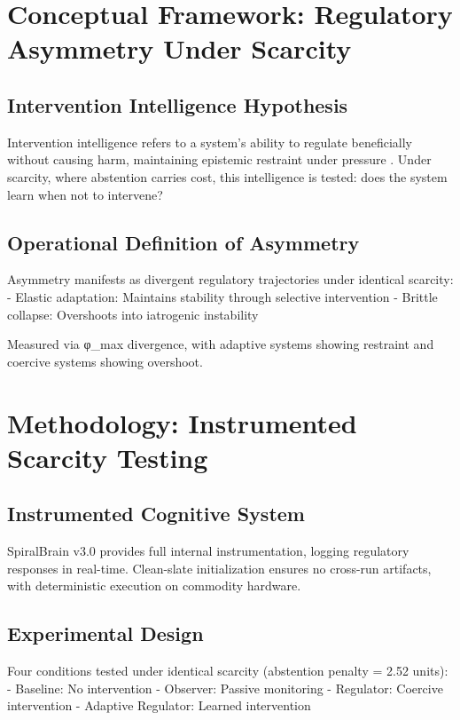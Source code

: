 \documentclass[12pt,a4paper]{report}
\begin{document}
\section{Conceptual Framework: Regulatory Asymmetry Under Scarcity}

\subsection{Intervention Intelligence Hypothesis}

Intervention intelligence refers to a system's ability to regulate beneficially without causing harm, maintaining epistemic restraint under pressure \cite{Cragin2026Thesis}. Under scarcity, where abstention carries cost, this intelligence is tested: does the system learn when not to intervene?

\subsection{Operational Definition of Asymmetry}

Asymmetry manifests as divergent regulatory trajectories under identical scarcity:
- Elastic adaptation: Maintains stability through selective intervention
- Brittle collapse: Overshoots into iatrogenic instability

Measured via φ_max divergence, with adaptive systems showing restraint and coercive systems showing overshoot.

\section{Methodology: Instrumented Scarcity Testing}

\subsection{Instrumented Cognitive System}

SpiralBrain v3.0 provides full internal instrumentation, logging regulatory responses in real-time. Clean-slate initialization ensures no cross-run artifacts, with deterministic execution on commodity hardware.

\subsection{Experimental Design}

Four conditions tested under identical scarcity (abstention penalty = 2.52 units):
- Baseline: No intervention
- Observer: Passive monitoring
- Regulator: Coercive intervention
- Adaptive Regulator: Learned intervention
\end{document}
